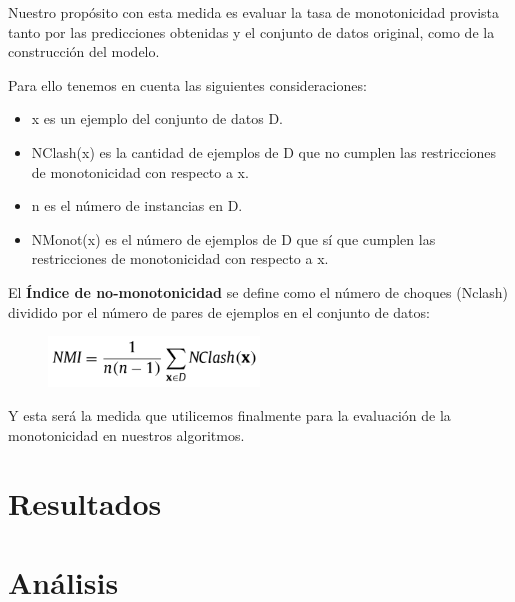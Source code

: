 Nuestro propósito con esta medida es evaluar la tasa de monotonicidad provista tanto por las predicciones obtenidas y el conjunto de datos original, como de la construcción del modelo.

Para ello tenemos en cuenta las siguientes consideraciones:
\begin{itemize}
	\item x es un ejemplo del conjunto de datos D.
	\item NClash(x) es la cantidad de ejemplos de D que no cumplen las restricciones de monotonicidad con respecto a x.
	\item n es el número de instancias en D.
	\item NMonot(x) es el número de ejemplos de D que sí que cumplen las restricciones de monotonicidad con respecto a x.
\end{itemize}

El \textbf{Índice de no-monotonicidad} se define como el número de choques (Nclash) dividido por el número de pares de ejemplos en el conjunto de datos:

\begin{figure}[H]
	\centering
	\includegraphics[width=0.5\textwidth]{imagenes/f8} 
\end{figure}

Y esta será la medida que utilicemos finalmente para la evaluación de la monotonicidad en nuestros algoritmos.

\section{Resultados}

\section{Análisis}

\newpage











